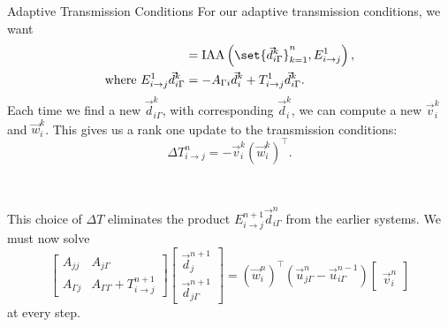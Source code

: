 \documentclass{beamer}
\DeclareMathOperator{\iaa}{IAA} %
\begin{document}
\begin{frame}{Adaptive Transmission Conditions}
For our adaptive transmission conditions, we want
\begin{align*}
	[ V_i^n, W_i^n ] & = \iaa \left ( \set{ \vec{d}_{i \Gamma}^k }_{k=1}^n, E_{i \to j}^1 \right ), \\
	\text{where} \ E_{i \to j}^1 \vec{d}_{i \Gamma}^k & = -A_{\Gamma i} \vec{d}_i^k + T_{i \to j}^1 \vec{d}_{i \Gamma}^k.
\end{align*}
Each time we find a new $\vec{d}_{i \Gamma}^k$, with corresponding $\vec{d}_i^k$, we can compute a new $\vec{v}_i^k$ and $\vec{w}_i^k$.
This gives us a rank one update to the transmission conditions:
\begin{equation*}
	\Delta T_{i \to j}^n = - \vec{v}_i^k \left ( \vec{w}_i^k \right )^\top.
\end{equation*}

~

This choice of $\Delta T$ eliminates the product $E_{i \to j}^{n+1} \vec{d}_{i \Gamma}^n$ from the earlier systems.
We must now solve
\begin{equation*}
	\begin{bmatrix} A_{jj} & A_{j \Gamma} \\ A_{\Gamma j} & A_{\Gamma \Gamma} + T_{i \to j}^{n+1} \end{bmatrix}
	\begin{bmatrix} \vec{d}_j^{n+1} \\ \vec{d}_{j \Gamma}^{n+1} \end{bmatrix}
	= (\vec{w}_i^n)^\top \left ( \vec{u}_{j \Gamma}^n - \vec{u}_{i \Gamma}^{n-1} \right )\begin{bmatrix} ~ \\ \vec{v}_i^n \end{bmatrix}
\end{equation*}
at every step.
\end{frame}
\end{document}
